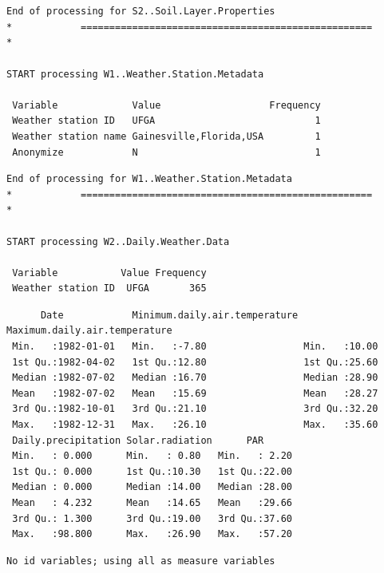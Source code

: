 \documentclass[
]{article}
\begin{document}
\begin{verbatim}


End of processing for S2..Soil.Layer.Properties
*            ===================================================            *

START processing W1..Weather.Station.Metadata

 Variable             Value                   Frequency
 Weather station ID   UFGA                            1
 Weather station name Gainesville,Florida,USA         1
 Anonymize            N                               1
\end{verbatim}

\begin{verbatim}
End of processing for W1..Weather.Station.Metadata
*            ===================================================            *

START processing W2..Daily.Weather.Data

 Variable           Value Frequency
 Weather station ID  UFGA       365
\end{verbatim}

\begin{verbatim}
      Date            Minimum.daily.air.temperature Maximum.daily.air.temperature
 Min.   :1982-01-01   Min.   :-7.80                 Min.   :10.00                
 1st Qu.:1982-04-02   1st Qu.:12.80                 1st Qu.:25.60                
 Median :1982-07-02   Median :16.70                 Median :28.90                
 Mean   :1982-07-02   Mean   :15.69                 Mean   :28.27                
 3rd Qu.:1982-10-01   3rd Qu.:21.10                 3rd Qu.:32.20                
 Max.   :1982-12-31   Max.   :26.10                 Max.   :35.60                
 Daily.precipitation Solar.radiation      PAR       
 Min.   : 0.000      Min.   : 0.80   Min.   : 2.20  
 1st Qu.: 0.000      1st Qu.:10.30   1st Qu.:22.00  
 Median : 0.000      Median :14.00   Median :28.00  
 Mean   : 4.232      Mean   :14.65   Mean   :29.66  
 3rd Qu.: 1.300      3rd Qu.:19.00   3rd Qu.:37.60  
 Max.   :98.800      Max.   :26.90   Max.   :57.20  
\end{verbatim}

\begin{verbatim}
No id variables; using all as measure variables
\end{verbatim}
\end{document}
